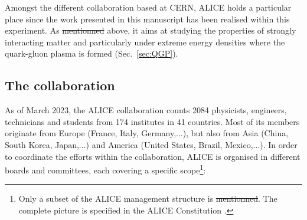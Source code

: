 \documentclass[ALICE,manyauthors]{cernphprep}
\newcommand{\Sec}       {\textsc{S}ec.~}
\providecommand{\DIFaddtex}[1]{{\protect\color{blue}\uwave{#1}}} %
\providecommand{\DIFdeltex}[1]{{\protect\color{red}\sout{#1}}}                      %
\providecommand{\DIFaddbegin}{} %
\providecommand{\DIFaddend}{} %
\providecommand{\DIFdelbegin}{} %
\providecommand{\DIFdelend}{} %
\providecommand{\DIFadd}[1]{\texorpdfstring{\DIFaddtex{#1}}{#1}} %
\providecommand{\DIFdel}[1]{\texorpdfstring{\DIFdeltex{#1}}{}} %
\newcommand{\DIFscaledelfig}{0.5}
\newlength{\DIFdelgraphicswidth} %
\newlength{\DIFdelgraphicsheight} %
\newcommand{\DIFaddincludegraphics}[2][]{{\color{blue}\fbox{\DIFOincludegraphics[#1]{#2}}}} %
\newcommand{\DIFdelincludegraphics}[2][]{%
\sbox{\DIFdelgraphicsbox}{\DIFOincludegraphics[#1]{#2}}%
\settoboxwidth{\DIFdelgraphicswidth}{\DIFdelgraphicsbox} %
\settoboxtotalheight{\DIFdelgraphicsheight}{\DIFdelgraphicsbox} %
\scalebox{\DIFscaledelfig}{%
\parbox[b]{\DIFdelgraphicswidth}{\usebox{\DIFdelgraphicsbox}\\[-\baselineskip] \rule{\DIFdelgraphicswidth}{0em}}\llap{\resizebox{\DIFdelgraphicswidth}{\DIFdelgraphicsheight}{%
\setlength{\unitlength}{\DIFdelgraphicswidth}%
\begin{picture}(1,1)%
\thicklines\linethickness{2pt} %
{\color[rgb]{1,0,0}\put(0,0){\framebox(1,1){}}}%
{\color[rgb]{1,0,0}\put(0,0){\line( 1,1){1}}}%
{\color[rgb]{1,0,0}\put(0,1){\line(1,-1){1}}}%
\end{picture}%
}\hspace*{3pt}}} %
} %
\DeclareRobustCommand{\DIFaddbegin}{\DIFOaddbegin \let\includegraphics\DIFaddincludegraphics} %
\DeclareRobustCommand{\DIFaddend}{\DIFOaddend \let\includegraphics\DIFOincludegraphics} %
\DeclareRobustCommand{\DIFdelbegin}{\DIFOdelbegin \let\includegraphics\DIFdelincludegraphics} %
\DeclareRobustCommand{\DIFdelend}{\DIFOaddend \let\includegraphics\DIFOincludegraphics} %
\begin{document}
Amongst the different collaboration based at CERN, ALICE holds a particular place since the work presented in this manuscript has been realised within this experiment. As \DIFdelbegin \DIFdel{mentionned }\DIFdelend \DIFaddbegin \DIFadd{mentioned }\DIFaddend above, it aims at studying the properties of strongly interacting matter and particularly under extreme energy densities where the quark-gluon plasma is formed (\Sec\ref{sec:QGP}). 

\subsection{The collaboration}

As of March 2023, the ALICE collaboration counts 2084 physicists, engineers, technicians and students from 174 institutes in 41 countries. Most of its members originate from Europe (France, Italy, Germany,...), but also from Asia (China, South Korea, Japan,...) and America (United States, Brazil, Mexico,...). In order to coordinate the efforts within the collaboration, ALICE is organised in different boards and committees, each covering a specific scope\footnote{Only a subset of the ALICE management structure is \DIFdelbegin \DIFdel{mentionned}\DIFdelend \DIFaddbegin \DIFadd{mentioned}\DIFaddend . The complete picture is specified in the ALICE Constitution \cite{alicecollaborationALICECollaboration}.}:
\end{document}

